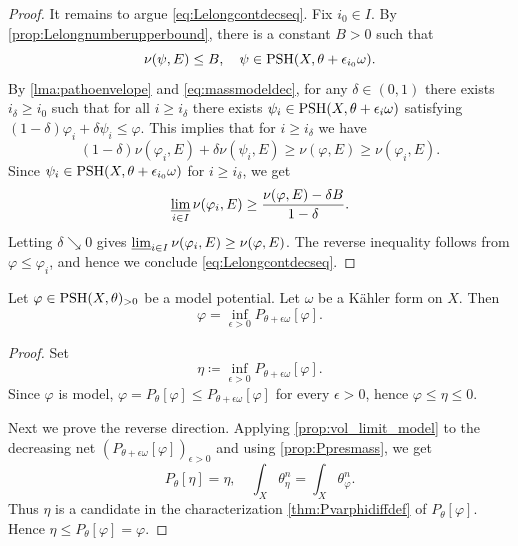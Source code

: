 \begin{proof}
    It remains to argue \eqref{eq:Lelongcontdecseq}.
    Fix $i_0\in I$. By \cref{prop:Lelongnumberupperbound}, there is a constant $B>0$ such that
    \[
    \nu(\psi,E)\leq B,\quad \psi\in \mathrm{PSH}(X,\theta+\epsilon_{i_0}\omega).
    \]
    By \cref{lma:pathoenvelope} and \eqref{eq:massmodeldec}, for any $\delta \in (0,1)$ there exists $i_{\delta}\geq i_0$ such that for all $i\geq i_{\delta}$ there exists $\psi_i \in \mathrm{PSH}(X,\theta+\epsilon_i\omega)$ satisfying $(1-\delta) \varphi_i + \delta \psi_i \leq \varphi$. This implies that for $i\geq i_{\delta}$ we have
    \[
    (1-\delta)\nu(\varphi_i,E) + \delta\nu(\psi_i,E) \geq \nu(\varphi,E) \geq \nu(\varphi_i,E).
    \]
    Since $\psi_i\in \mathrm{PSH}(X,\theta+\epsilon_{i_0}\omega)$ for $i\geq i_{\delta}$, we get
    \[
        \varliminf_{i\in I}\nu(\varphi_i,E)\geq \frac{\nu(\varphi,E)-\delta B}{1-\delta}.
    \]
    Letting $\delta\searrow 0$ gives $\varliminf_{i\in I}\nu(\varphi_i,E)\geq \nu(\varphi,E)$. The reverse inequality follows from $\varphi\leq \varphi_i$, and hence we conclude \eqref{eq:Lelongcontdecseq}.
\end{proof}








\begin{corollary}\label{cor:varphiperturbtheta}
    Let $\varphi\in \mathrm{PSH}(X,\theta)_{>0}$ be a model potential. Let $\omega$ be a Kähler form on $X$.
    Then
    \[
    \varphi=\inf_{\epsilon>0} P_{\theta+\epsilon\omega}[\varphi].
    \]
\end{corollary}
\begin{proof}
    Set
    \[
        \eta\coloneqq\inf_{\epsilon>0}P_{\theta+\epsilon\omega}[\varphi].
    \]
    Since $\varphi$ is model, $\varphi=P_{\theta}[\varphi]\leq P_{\theta+\epsilon\omega}[\varphi]$ for every $\epsilon>0$, hence $\varphi\leq\eta\leq 0$.

    Next we prove the reverse direction.
    Applying \cref{prop:vol_limit_model} to the decreasing net $(P_{\theta+\epsilon\omega}[\varphi])_{\epsilon>0}$ and using \cref{prop:Ppresmass}, we get
    \[
        P_\theta[\eta]=\eta,\quad \int_X\theta_\eta^n=\int_X\theta_\varphi^n.
    \]
    Thus $\eta$ is a candidate in the characterization \cref{thm:Pvarphidiffdef} of $P_\theta[\varphi]$. Hence $\eta\leq P_\theta[\varphi]=\varphi$.
\end{proof}

